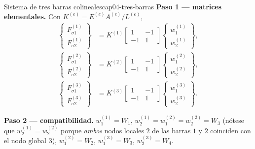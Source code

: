 \begin{ejemplo}{Sistema de tres barras colineales}{cap04-tres-barras}
\textbf{Paso 1 --- matrices elementales.} Con $K^{(e)}=E^{(e)}A^{(e)}/L^{(e)}$,
\begin{align*}
\begin{Bmatrix} F_{\sigma1}^{(1)} \\ F_{\sigma2}^{(1)} \end{Bmatrix} &= K^{(1)}\begin{bmatrix}1&-1\\-1&1\end{bmatrix}\begin{Bmatrix} w_1^{(1)} \\ w_2^{(1)} \end{Bmatrix}, \\[4pt]
\begin{Bmatrix} F_{\sigma1}^{(2)} \\ F_{\sigma2}^{(2)} \end{Bmatrix} &= K^{(2)}\begin{bmatrix}1&-1\\-1&1\end{bmatrix}\begin{Bmatrix} w_1^{(2)} \\ w_2^{(2)} \end{Bmatrix}, \\[4pt]
\begin{Bmatrix} F_{\sigma1}^{(3)} \\ F_{\sigma2}^{(3)} \end{Bmatrix} &= K^{(3)}\begin{bmatrix}1&-1\\-1&1\end{bmatrix}\begin{Bmatrix} w_1^{(3)} \\ w_2^{(3)} \end{Bmatrix} .
\end{align*}

\textbf{Paso 2 --- compatibilidad.} $w_1^{(1)}=W_1$, $w_2^{(1)}=w_1^{(2)}=w_2^{(2)}\!\!=W_3$ (nótese que $w_2^{(1)}=w_2^{(2)}$ porque \emph{ambos} nodos locales $2$ de las barras $1$ y $2$ coinciden con el nodo global $3$), $w_1^{(2)}=W_2$, $w_1^{(3)}=W_3$, $w_2^{(3)}=W_4$.


\end{ejemplo}
